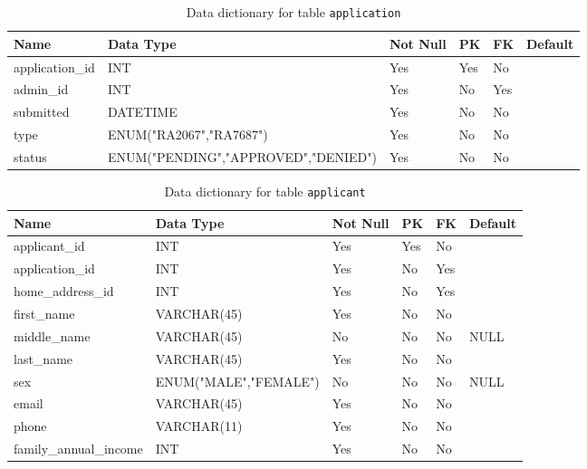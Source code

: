 \documentclass{article}
\newcommand{\tname}[1]{\color{blue}\texttt{#1}}
\begin{document}
\begin{table}[H]
    \centering
    \begin{tabularx}{\textwidth}{m{1.0in}Xllll}
        \hline
        Name            & Data Type                           & Not Null & PK  & FK  & Default \\ \hline
        application\_id & INT                                 & Yes      & Yes & No  & ~       \\
        admin\_id       & INT                                 & Yes      & No  & Yes & ~       \\
        submitted       & DATETIME                            & Yes      & No  & No  & ~       \\
        type            & ENUM("RA2067","RA7687")             & Yes      & No  & No  & ~       \\
        status          & ENUM("PENDING","APPROVED","DENIED") & Yes      & No  & No  & ~       \\
    \end{tabularx}
    \caption{Data dictionary for table \tname{application}}
\end{table}

\begin{table}[H]
    \centering
    \begin{tabularx}{\textwidth}{m{1.5in}Xllll}
        \hline
        Name                   & Data Type             & Not Null & PK  & FK  & Default \\ \hline
        applicant\_id          & INT                   & Yes      & Yes & No  & ~       \\
        application\_id        & INT                   & Yes      & No  & Yes & ~       \\
        home\_address\_id      & INT                   & Yes      & No  & Yes & ~       \\
        first\_name            & VARCHAR(45)           & Yes      & No  & No  & ~       \\
        middle\_name           & VARCHAR(45)           & No       & No  & No  & NULL    \\
        last\_name             & VARCHAR(45)           & Yes      & No  & No  & ~       \\
        sex                    & ENUM("MALE","FEMALE") & No       & No  & No  & NULL    \\
        email                  & VARCHAR(45)           & Yes      & No  & No  & ~       \\
        phone                  & VARCHAR(11)           & Yes      & No  & No  & ~       \\
        family\_annual\_income & INT                   & Yes      & No  & No  & ~       \\
    \end{tabularx}
    \caption{Data dictionary for table \tname{applicant}}
\end{table}
\end{document}
